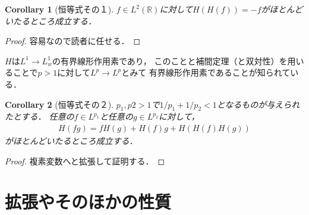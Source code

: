 \documentclass[dvipdfmx,autodetect-engine]{jsarticle}
\newtheorem{corollary}{Corollary}[theorem]
\theoremstyle{remark}
\theoremstyle{definition}
\newcommand{\R}{\mathbb{R}}
\begin{document}
\begin{corollary}[恒等式その１]
    $f \in L^2(\R)$に対して$H(H(f)) = - f$がほとんどいたるところ成立する．
\end{corollary}

\begin{proof}
    容易なので読者に任せる．
\end{proof}

$H$は$L^1 \to L^1_w$の有界線形作用素であり，
このことと補間定理（と双対性）を用いることで$p>1$に対して$L^p \to L^p$とみて
有界線形作用素であることが知られている．

\begin{corollary}[恒等式その２]
    $p_1,p2>1$で$1/p_1 + 1/p_2 < 1$となるものが与えられたとする．
    任意の$f\in L^{p_1}$と任意の$g \in L^{p_2}$に対して，
    \begin{align}
        H(fg) = fH(g) + H(f)g + H\left(H(f)H(g)\right)
    \end{align}
    がほとんどいたるところ成立する．
\end{corollary}

\begin{proof}
    複素変数へと拡張して証明する．
\end{proof}


\section{拡張やそのほかの性質}
    
\end{document}
